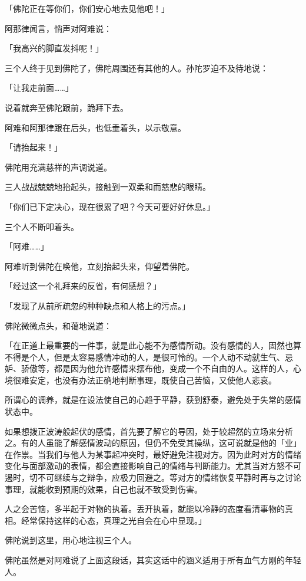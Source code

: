 \documentclass[twoside,openany]{book}
\begin{document}
「佛陀正在等你们，你们安心地去见他吧！」

阿那律闻言，悄声对阿难说：

「我高兴的脚直发抖呢！」

三个人终于见到佛陀了，佛陀周围还有其他的人。孙陀罗迫不及待地说：

「让我走前面……」

说着就奔至佛陀跟前，跪拜下去。

阿难和阿那律跟在后头，也低垂着头，以示敬意。

「请抬起来！」

佛陀用充满慈祥的声调说道。

三人战战兢兢地抬起头，接触到一双柔和而慈悲的眼睛。

「你们已下定决心，现在很累了吧？今天可要好好休息。」

三个人不断叩着头。

「阿难……」

阿难听到佛陀在唤他，立刻抬起头来，仰望着佛陀。

「经过这一个礼拜来的反省，有何感想？」





「发现了从前所疏忽的种种缺点和人格上的污点。」

佛陀微微点头，和蔼地说道：

「在正道上最重要的一件事，就是此心能不为感情所动。没有感情的人，固然也算不得是个人，但是太容易感情冲动的人，是很可怜的。一个人动不动就生气、忌妒、骄傲等，都是因为他允许感情来摆布他，变成一个不自由的人。这样的人，心境很难安定，也没有办法正确地判断事理，既使自己苦恼，又使他人悲哀。

所谓心的调养，就是在设法使自己的心趋于平静，获到舒泰，避免处于失常的感情状态中。

如果想拨正波涛般起伏的感情，首先要了解它的导因，处于较超然的立场来分析之。有的人虽能了解感情波动的原因，但仍不免受其操纵，这可说就是他的「业」在作祟。当我们与他人为某事起冲突时，最好避免注视对方。因为此时对方的情绪变化与面部激动的表情，都会直接影响自己的情绪与判断能力。尤其当对方怒不可遏时，切不可继续与之辩争，应极力回避之。等对方的情绪恢复平静时再与之讨论事理，就能收到预期的效果，自己也就不致受到伤害。

人之会苦恼，多半起于对物的执着。丢开执着，就能以冷静的态度看清事物的真相。经常保持这样的心态，真理之光自会在心中显现。」

佛陀说到这里，用心地注视三个人。

佛陀虽然是对阿难说了上面这段话，其实这话中的涵义适用于所有血气方刚的年轻人。
\end{document}
